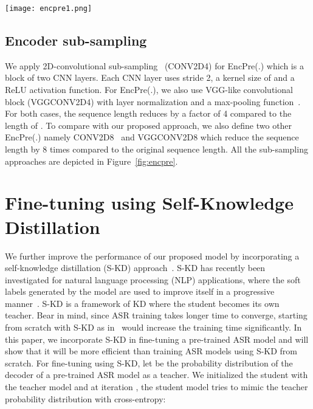 \documentclass{article}
\begin{document}
\begin{figure*}[ht]
\vskip 0.2in
    \begin{center}
    \centerline{\texttt{[image: encpre1.png]}}
\caption{Different types of Encoder sub-sampling. (a) CONV2D4, (b) CONV2D8, (c) VGGCONV2D4, and (d) VGGCONV2D8}
    \label{fig:encpre}
    \end{center}
\vskip -0.2in
\end{figure*}
\subsection{Encoder sub-sampling}

We apply 2D-convolutional sub-sampling~\citep{karita2019asru} (CONV2D4) for EncPre(.) which is a block of two CNN layers. Each CNN layer uses stride 2, a kernel size of  and a ReLU activation function. For EncPre(.), we also use VGG-like convolutional block (VGGCONV2D4) with layer normalization and a max-pooling function~\citep{wang2020a}. For both cases, the sequence length reduces by a factor of 4 compared to the length of . To compare with our proposed approach, we also define two other EncPre(.) namely CONV2D8~\citep{espnet} and VGGCONV2D8 which reduce the sequence length by 8 times compared to the original sequence length. 
All the sub-sampling approaches are depicted in Figure~\ref{fig:encpre}. 


\section{Fine-tuning using Self-Knowledge Distillation}
We further improve the performance of our proposed model by incorporating a self-knowledge distillation (S-KD) approach~\citep{selfkdgeneralization}. S-KD has recently been investigated for natural language processing (NLP) applications, where the soft labels generated by the model are used to improve itself in a progressive manner~\citep{selfkdnlp, selfkdgeneralization}. S-KD is a framework of KD where the student becomes its own teacher. Bear in mind, since ASR training takes longer time to converge, starting from scratch with S-KD as in~\citep{selfkdgeneralization} would increase the training time significantly. In this paper, we incorporate S-KD in fine-tuning a pre-trained ASR model and will show that it will be more efficient than training ASR models using S-KD from scratch. For fine-tuning using S-KD, let  be the probability distribution of the decoder of a pre-trained ASR model as a teacher. We initialized the student with the teacher model and at iteration , the student model tries to mimic the teacher probability distribution with cross-entropy:
\end{document}
